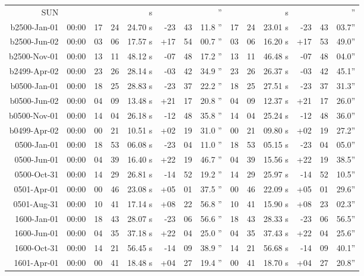 \begin{longtable}{r@{\,}r|r@{h\,}r@{m\,}r<{s}|r@{°\,}r@{'\,}r<{''}||r@{h\,}r@{m\,}r<{s}|r@{°\,}r@{'\,}r<{''}}
SUN\\
b2500-Jan-01 & 00:00  &   17 & 24 & 24.70 & -23 & 43 & 11.8 & 17&24&23.01 & -23&43&03.7\\ %
b2500-Jun-02 & 00:00  &   03 & 06 & 17.57 & +17 & 54 & 00.7 & 03&06&16.20 & +17&53&49.0\\ %
b2500-Nov-01 & 00:00  &   13 & 11 & 48.12 & -07 & 48 & 17.2 & 13&11&46.48 & -07&48&04.0\\ %
b2499-Apr-02 & 00:00  &   23 & 26 & 28.14 & -03 & 42 & 34.9 & 23&26&26.37 & -03&42&45.1\\ %
b0500-Jan-01 & 00:00  &   18 & 25 & 28.83 & -23 & 37 & 22.2 & 18&25&27.51 & -23&37&31.3\\ %
b0500-Jun-02 & 00:00  &   04 & 09 & 13.48 & +21 & 17 & 20.8 & 04&09&12.37 & +21&17&26.0\\ %
b0500-Nov-01 & 00:00  &   14 & 04 & 26.18 & -12 & 48 & 35.8 & 14&04&25.24 & -12&48&36.0\\ %
b0499-Apr-02 & 00:00  &   00 & 21 & 10.51 & +02 & 19 & 31.0 & 00&21&09.80 & +02&19&27.2\\ %
 0500-Jan-01 & 00:00  &   18 & 53 & 06.08 & -23 & 04 & 11.0 & 18&53&05.15 & -23&04&05.0\\ %
 0500-Jun-01 & 00:00  &   04 & 39 & 16.40 & +22 & 19 & 46.7 & 04&39&15.56 & +22&19&38.5\\ %
 0500-Oct-31 & 00:00  &   14 & 29 & 26.81 & -14 & 52 & 19.2 & 14&29&25.97 & -14&52&10.5\\ %
 0501-Apr-01 & 00:00  &   00 & 46 & 23.08 & +05 & 01 & 37.5 & 00&46&22.09 & +05&01&29.6\\ %
 0501-Aug-31 & 00:00  &   10 & 41 & 17.14 & +08 & 22 & 56.8 & 10&41&15.90 & +08&23&02.3\\ %
 1600-Jan-01 & 00:00  &   18 & 43 & 28.07 & -23 & 06 & 56.6 & 18&43&28.33 & -23&06&56.5\\ %
 1600-Jun-01 & 00:00  &   04 & 35 & 37.18 & +22 & 04 & 25.0 & 04&35&37.43 & +22&04&25.6\\ %
 1600-Oct-31 & 00:00  &   14 & 21 & 56.45 & -14 & 09 & 38.9 & 14&21&56.68 & -14&09&40.1\\ %
 1601-Apr-01 & 00:00  &   00 & 41 & 18.48 & +04 & 27 & 19.4 & 00&41&18.70 & +04&27&20.8\\ %

\end{longtable}

